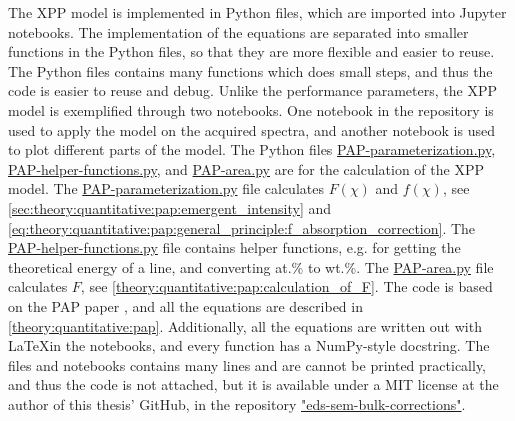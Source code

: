 The XPP model is implemented in Python files, which are imported into Jupyter notebooks.
The implementation of the equations are separated into smaller functions in the Python files, so that they are more flexible and easier to reuse.
The Python files contains many functions which does small steps, and thus the code is easier to reuse and debug.
Unlike the performance parameters, the XPP model is exemplified through two notebooks.
One notebook in the repository is used to apply the model on the acquired spectra, and another notebook is used to plot different parts of the model.
The Python files 
\href{https://github.com/brynjarmorka/eds-sem-bulk-corrections/blob/main/PAP_functions/PAP_parameterization.py}{PAP-parameterization.py}, 
\href{https://github.com/brynjarmorka/eds-sem-bulk-corrections/blob/main/PAP_functions/PAP_helper_functions.py}{PAP-helper-functions.py}, and 
\href{https://github.com/brynjarmorka/eds-sem-bulk-corrections/blob/main/PAP_functions/PAP_area_F.py}{PAP-area.py} are for the calculation of the XPP model.
The 
\href{https://github.com/brynjarmorka/eds-sem-bulk-corrections/blob/main/PAP_functions/PAP_parameterization.py}{PAP-parameterization.py}
file calculates $F(\chi)$ and $f(\chi)$, see \cref{sec:theory:quantitative:pap:emergent_intensity} and \cref{eq:theory:quantitative:pap:general_principle:f_absorption_correction}.
The 
\href{https://github.com/brynjarmorka/eds-sem-bulk-corrections/blob/main/PAP_functions/PAP_helper_functions.py}{PAP-helper-functions.py}
file contains helper functions, e.g. for getting the theoretical energy of a line, and converting at.\% to wt.\%.
The 
\href{https://github.com/brynjarmorka/eds-sem-bulk-corrections/blob/main/PAP_functions/PAP_area_F.py}{PAP-area.py}
file calculates $F$, see \cref{theory:quantitative:pap:calculation_of_F}.
The code is based on the PAP paper \cite{pap_1991}, and all the equations are described in \cref{theory:quantitative:pap}.
Additionally, all the equations are written out with \LaTeX in the notebooks, and every function has a NumPy-style docstring.
The files and notebooks contains many lines and are cannot be printed practically, and thus the code is not attached, but it is available under a MIT license at the author of this thesis' GitHub, in the repository \href{https://github.com/brynjarmorka/eds-sem-bulk-corrections}{"eds-sem-bulk-corrections"}.

